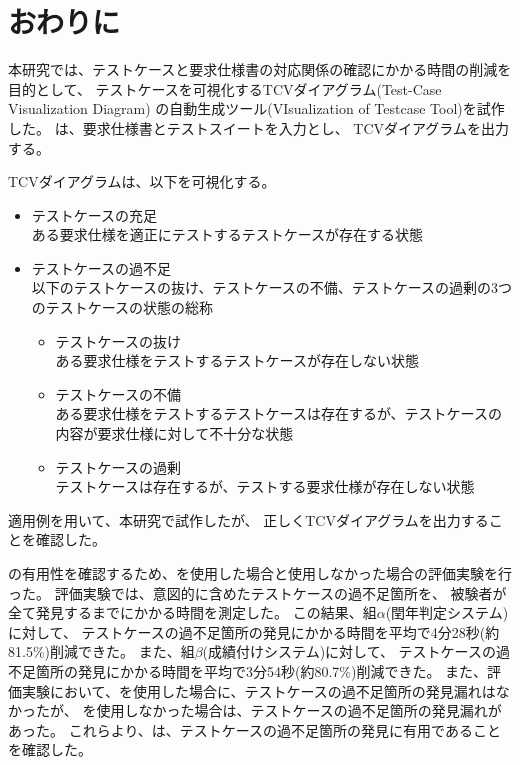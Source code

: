 \chapter{おわりに}\label{cha:Conclusion}
本研究では、テストケースと要求仕様書の対応関係の確認にかかる時間の削減を目的として、
テストケースを可視化するTCVダイアグラム(Test-Case Visualization Diagram)
の自動生成ツール\tool{}(VIsualization of Testcase Tool)を試作した。
\tool{}は、要求仕様書とテストスイートを入力とし、
TCVダイアグラムを出力する。

TCVダイアグラムは、以下を可視化する。

\begin{itemize}
    \item テストケースの充足\\
    ある要求仕様を適正にテストするテストケースが存在する状態
    \item テストケースの過不足\\
    以下のテストケースの抜け、テストケースの不備、テストケースの過剰の3つのテストケースの状態の総称
    \begin{itemize}
        \item テストケースの抜け\\
        ある要求仕様をテストするテストケースが存在しない状態
        \item テストケースの不備\\
        ある要求仕様をテストするテストケースは存在するが、テストケースの内容が要求仕様に対して不十分な状態
        \item テストケースの過剰\\
        テストケースは存在するが、テストする要求仕様が存在しない状態
    \end{itemize}
\end{itemize}

適用例を用いて、本研究で試作した\tool{}が、
正しくTCVダイアグラムを出力することを確認した。

\tool{}の有用性を確認するため、\tool{}を使用した場合と使用しなかった場合の評価実験を行った。
評価実験では、意図的に含めたテストケースの過不足箇所を、
被験者が全て発見するまでにかかる時間を測定した。
この結果、組$\alpha$(閏年判定システム)に対して、
テストケースの過不足箇所の発見にかかる時間を平均で4分28秒(約81.5\%)削減できた。
また、組$\beta$(成績付けシステム)に対して、
テストケースの過不足箇所の発見にかかる時間を平均で3分54秒(約80.7\%)削減できた。
また、評価実験において、\tool{}を使用した場合に、テストケースの過不足箇所の発見漏れはなかったが、
\tool{}を使用しなかった場合は、テストケースの過不足箇所の発見漏れがあった。
これらより、\tool{}は、テストケースの過不足箇所の発見に有用であることを確認した。


